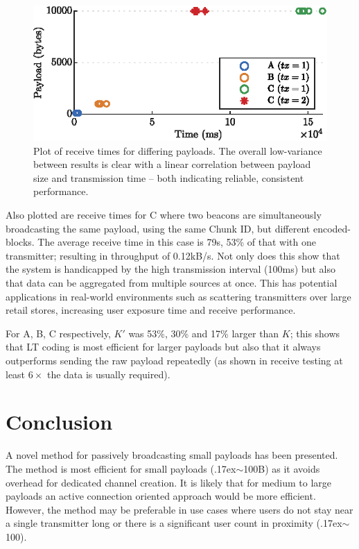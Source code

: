 \documentclass[conference]{IEEEtran} %
\newcommand{\mytilde}{\raise.17ex\hbox{$\scriptstyle\mathtt{\sim}$}}
\begin{document}
\begin{figure}[H]
    \centering
   	\includegraphics{Figures/networking_plot}
    \caption{
    Plot of receive times for differing payloads. The overall low-variance between results is clear with a linear correlation between payload size and transmission time -- both indicating reliable, consistent performance.
    }
    \label{fig:receive_time_plot}
\end{figure}

Also plotted are receive times for C where two beacons are simultaneously broadcasting the same payload, using the same Chunk ID, but different encoded-blocks. The average receive time in this case is 79s, 53\% of that with one transmitter; resulting in throughput of 0.12kB/s. Not only does this show that the system is handicapped by the high transmission interval (100ms) but also that data can be aggregated from multiple sources at once. This has potential applications in real-world environments such as scattering transmitters over large retail stores, increasing user exposure time and receive performance. 

For A, B, C respectively, $K'$ was 53\%, 30\% and 17\% larger than $K$; this shows that LT coding is most efficient for larger payloads but also that it always outperforms sending the raw payload repeatedly (as shown in receive testing at least $6\times $ the data is usually required). 


%

\section{Conclusion}
A novel method for passively broadcasting small payloads has been presented. The method is most efficient for small payloads (\mytilde 100B) as it avoids overhead for dedicated channel creation. It is likely that for medium to large payloads an active connection oriented approach would be more efficient. However, the method may be preferable  in use cases where users do not stay near a single transmitter long or there is a significant user count in proximity (\mytilde 100). 
\end{document}
